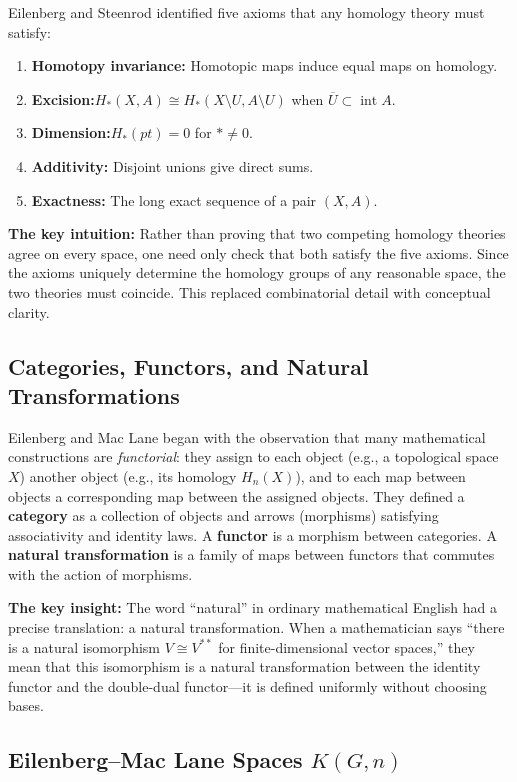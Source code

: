 Eilenberg and Steenrod identified five axioms that any homology theory must satisfy:
\begin{enumerate}
    \item \textbf{Homotopy invariance:} Homotopic maps induce equal maps on homology.
    \item \textbf{Excision:}$H_*(X, A) \cong H_*(X\setminus U, A\setminus U)$ when $\overline{U} \subset \operatorname{int} A$.
    \item \textbf{Dimension:}$H_*(pt) = 0$ for $* \neq 0$.
    \item \textbf{Additivity:} Disjoint unions give direct sums.
    \item \textbf{Exactness:} The long exact sequence of a pair $(X,A)$.
\end{enumerate}

\textbf{The key intuition:} Rather than proving that two competing homology theories agree on every space, one need only check that both satisfy the five axioms. Since the axioms uniquely determine the homology groups of any reasonable space, the two theories must coincide. This replaced combinatorial detail with conceptual clarity.

\subsection{Categories, Functors, and Natural Transformations}

Eilenberg and Mac Lane began with the observation that many mathematical constructions are \textit{functorial}: they assign to each object (e.g., a topological space $X$) another object (e.g., its homology $H_n(X)$), and to each map between objects a corresponding map between the assigned objects. They defined a \textbf{category} as a collection of objects and arrows (morphisms) satisfying associativity and identity laws. A \textbf{functor} is a morphism between categories. A \textbf{natural transformation} is a family of maps between functors that commutes with the action of morphisms.

\textbf{The key insight:} The word ``natural'' in ordinary mathematical English had a precise translation: a natural transformation. When a mathematician says ``there is a natural isomorphism $V \cong V^{**}$ for finite-dimensional vector spaces,'' they mean that this isomorphism is a natural transformation between the identity functor and the double-dual functor---it is defined uniformly without choosing bases.

\subsection{Eilenberg--Mac Lane Spaces \texorpdfstring{$K(G,n)$}{K(G,n)}}

